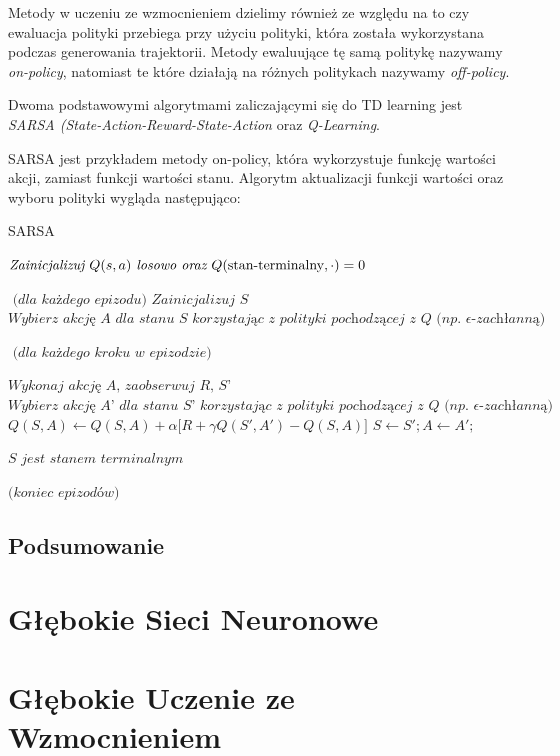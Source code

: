 \documentclass[licencjacka]{pracamgr}
\begin{document}
Metody w uczeniu ze wzmocnieniem dzielimy również ze względu na to czy ewaluacja polityki przebiega przy użyciu polityki, która została wykorzystana podczas generowania trajektorii. Metody ewaluujące tę samą politykę nazywamy \emph{on-policy}, natomiast te które działają na różnych politykach nazywamy \emph{off-policy}.

Dwoma podstawowymi algorytmami zaliczającymi się do TD learning jest \emph{SARSA (State-Action-Reward-State-Action} oraz \emph{Q-Learning}.

SARSA jest przykładem metody on-policy, która wykorzystuje funkcję wartości akcji, zamiast funkcji wartości stanu. Algorytm aktualizacji funkcji wartości oraz wyboru polityki wygląda następująco:

\begin{algorithm}
\caption{SARSA}\label{sarsa}
\begin{algorithmic}[1]
\State $\textit{Zainicjalizuj } Q(s, a) \textit{ losowo oraz } Q(\textit{\emph{stan-terminalny}}, \cdot ) = 0$

\Repeat $ \textit{ (dla każdego epizodu)} $
\State $\textit{Zainicjalizuj } S$
\State $\textit{Wybierz akcję A dla stanu S korzystając z polityki pochodzącej z Q (np. } \epsilon \textit{-zachłanną)} $

\Repeat $\textit{ (dla każdego kroku w epizodzie)} $

\State $ \textit{Wykonaj akcję A, zaobserwuj R, S'} $
\State $ \textit{Wybierz akcję A' dla stanu S' korzystając z polityki pochodzącej z Q (np. } \epsilon \textit{-zachłanną)} $
\State $ Q(S, A) \gets Q(S,A) + \alpha \big[ R + \gamma Q(S', A') - Q(S, A) \big] $
\State $ S \gets S'; A \gets A'; $

\Until $ S \textit{ jest stanem terminalnym} $

\Until $ \textit{(koniec epizodów)}$ 
\end{algorithmic}
\end{algorithm}

\section{Podsumowanie}

\chapter{Głębokie Sieci Neuronowe}

\chapter{Głębokie Uczenie ze Wzmocnieniem}
\end{document}
